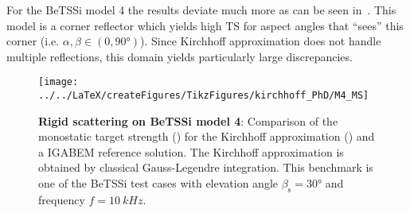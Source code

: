For the BeTSSi model 4 the results deviate much more as can be seen in~. This model is a corner reflector which yields high TS for aspect angles that ``sees'' this corner (i.e. $\alpha,\beta\in(0,\ang{90})$). Since Kirchhoff approximation does not handle multiple reflections, this domain yields particularly large discrepancies. 
\begin{figure}
	\centering
	\texttt{[image: ../../LaTeX/createFigures/TikzFigures/kirchhoff\_PhD/M4\_MS]}
	\caption{\textbf{Rigid scattering on BeTSSi model 4}: Comparison of the monostatic target strength () for the Kirchhoff approximation () and a IGABEM reference solution. The Kirchhoff approximation is obtained by classical Gauss-Legendre integration. This benchmark is one of the BeTSSi test cases with elevation angle $\beta_{\mathrm{s}}=\ang{30}$ and frequency $f=\SI{10}{kHz}$.}
	\label{Fig4:BeTSSi_M4results}
\end{figure}

